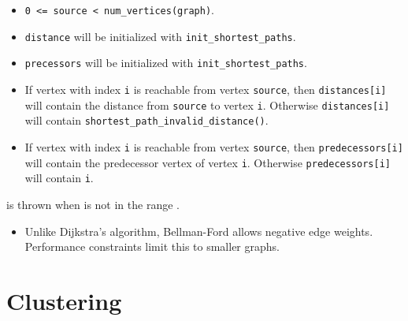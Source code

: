 \begin{itemdescr}
      \pnum\preconditions
            \begin{itemize}
                  \item
                        \lstinline{0 <= source < num_vertices(graph)}. 
                  \item
                        \lstinline{distance} will be initialized with \lstinline{init_shortest_paths}.
                  \item
                        \lstinline{precessors} will be initialized with \lstinline{init_shortest_paths}.
            \end{itemize}
      \pnum\effects
            \begin{itemize}
                  \item
                        If vertex with index \lstinline{i} is reachable from vertex \lstinline{source}, then
                        \lstinline{distances[i]} will contain the distance from \lstinline{source} to vertex
                        \lstinline{i}.  Otherwise \lstinline{distances[i]} will contain
                        \lstinline{shortest_path_invalid_distance()}.
                  \item
                        If vertex with index \lstinline{i} is reachable
                        from vertex \lstinline{source}, then \lstinline{predecessors[i]} will contain the
                        predecessor vertex of vertex \lstinline{i}. Otherwise \lstinline{predecessors[i]} will contain
                        \lstinline{i}.
            \end{itemize}
      \pnum\throws {} is thrown when  is not in the range .  \\
      \pnum\remarks 
            \begin{itemize}
                  \item
                        Unlike Dijkstra's algorithm, Bellman-Ford allows negative edge weights. Performance constraints limit this to smaller graphs.
            \end{itemize}
\end{itemdescr}


\section{Clustering}
